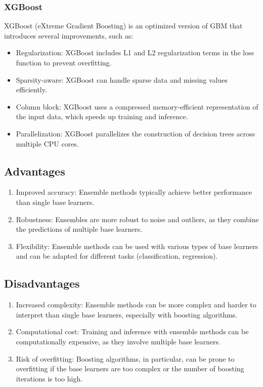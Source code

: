 \documentclass[12pt]{article}
\begin{document}
\subsubsection{XGBoost}

XGBoost (eXtreme Gradient Boosting) is an optimized version of GBM that introduces several improvements, such as:

\begin{itemize}
\item Regularization: XGBoost includes L1 and L2 regularization terms in the loss function to prevent overfitting.
\item Sparsity-aware: XGBoost can handle sparse data and missing values efficiently.
\item Column block: XGBoost uses a compressed memory-efficient representation of the input data, which speeds up training and inference.
\item Parallelization: XGBoost parallelizes the construction of decision trees across multiple CPU cores.
\end{itemize}

\subsection{Advantages}
\begin{enumerate}
\item Improved accuracy: Ensemble methods typically achieve better performance than single base learners.
\item Robustness: Ensembles are more robust to noise and outliers, as they combine the predictions of multiple base learners.
\item Flexibility: Ensemble methods can be used with various types of base learners and can be adapted for different tasks (classification, regression).
\end{enumerate}

\subsection{Disadvantages}
\begin{enumerate}
\item Increased complexity: Ensemble methods can be more complex and harder to interpret than single base learners, especially with boosting algorithms.
\item Computational cost: Training and inference with ensemble methods can be computationally expensive, as they involve multiple base learners.
\item Risk of overfitting: Boosting algorithms, in particular, can be prone to overfitting if the base learners are too complex or the number of boosting iterations is too high.
\end{enumerate}
\end{document}
